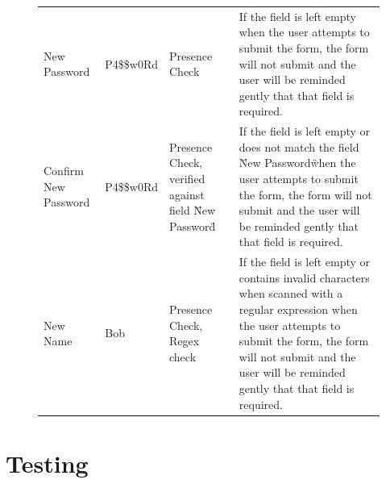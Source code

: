 \begin{figure}
\begin{table}[]
\begin{tabular}{llll}
New Password                                     & P4\$\$w0Rd                                                             & Presence Check                                                               & If the field is left empty when the user attempts to submit the form, the form will not submit and the user will be reminded gently that that field is required.                                                                                                                                                 \\
Confirm New Password                             & P4\$\$w0Rd                                                             & Presence Check, verified against field \"New Password\"                        & If the field is left empty or does not match the field \"New Password\"  when the user attempts to submit the form, the form will not submit and the user will be reminded gently that that field is required.                                                                                                     \\
New Name                                         & Bob                                                                   & Presence Check, Regex check                                                  & If the field is left empty or contains invalid characters when scanned with a regular expression when the user attempts to submit the form, the form will not submit and the user will be reminded gently that that field is required.
\end{tabular}
\end{table}
\end{figure}

\section{Testing}


